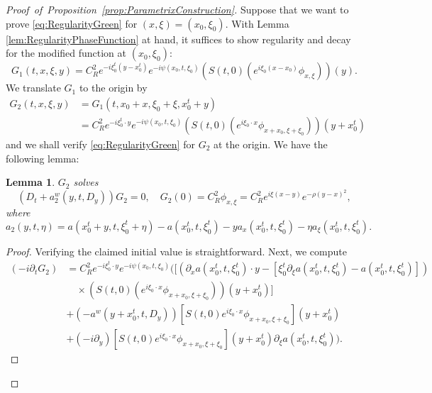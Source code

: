 \documentclass{amsart}
\newtheorem{lemma}[theorem]{Lemma}
\theoremstyle{definition}
\begin{document}
\begin{proof}[Proof~of~Proposition~\ref{prop:ParametrixConstruction}]
Suppose that we want to prove \eqref{eq:RegularityGreen} for $(x,\xi) = (x_0,\xi_0)$. With Lemma \ref{lem:RegularityPhaseFunction} at hand, it suffices to show regularity and decay for the modified function at $(x_0,\xi_0)$:
\begin{equation*}
G_1(t,x,\xi,y) = C_R^2 e^{-i \xi_0^t (y-x_0^t) } e^{-i \psi(x_0,t,\xi_0)} (S(t,0) (e^{i \xi_0 (x-x_0)} \phi_{x,\xi}))(y).
\end{equation*}
We translate $G_1$ to the origin by
\begin{equation*}
\begin{split}
G_2(t,x,\xi,y) &= G_1(t,x_0+x,\xi_0+\xi,x_0^t + y) \\
&= C_R^2 e^{-i \xi_0^t \cdot y} e^{-i \psi(x_0,t,\xi_0)} (S(t,0) (e^{i \xi_0 \cdot x} \phi_{x+x_0,\xi+\xi_0}))(y+x_0^t)
\end{split}
\end{equation*}
and we shall verify \eqref{eq:RegularityGreen} for $G_2$ at the origin. We have the following lemma:
\begin{lemma}
$G_2$ solves
\begin{equation*}
(D_t + a_2^w(y,t,D_y)) G_2 = 0, \quad G_2(0) = C_{R}^2 \phi_{x,\xi} = C_R^2 e^{i \xi (x-y)} e^{- \rho(y-x)^2},
\end{equation*}
where
\begin{equation*}
a_2(y,t,\eta) = a(x_0^t+y,t, \xi_0^t + \eta) - a(x_0^t,t,\xi_0^t) - y a_x(x_0^t,t,\xi_0^t) - \eta a_\xi(x_0^t,t,\xi_0^t).
\end{equation*}    
\end{lemma}
\begin{proof}
    Verifying the claimed initial value is straightforward. Next, we compute
    \begin{equation}
    \label{eq:ExpansionTimeDerivativeModGreen}
        \begin{split}
            (-i \partial_t G_2) &= C_R^2 e^{-i \xi_0^t \cdot y} e^{-i \psi(x_0,t,\xi_0)} \big( \big[ (\partial_x a(x_0^t,t,\xi_0^t) \cdot y - [ \xi_0^t \partial_{\xi} a(x_0^t,t,\xi_0^t) - a(x_0^t,t,\xi_0^t)]) \\
            &\quad \times (S(t,0) (e^{i \xi_0 \cdot x} \phi_{x+x_0,\xi+\xi_0}))(y+x_0^t) \big] \\
            \quad &+ (-a^w (y+x_0^t,t,D_y))[S(t,0) e^{i \xi_0 \cdot x} \phi_{x+x_0,\xi+\xi_0}](y+x_0^t) \\
            \quad &+ (-i \partial_y)[S(t,0) e^{i \xi_0 \cdot x} \phi_{x+x_0,\xi+\xi_0}](y+x_0^t) \partial_{\xi} a(x_0^t,t,\xi_0^t) \big).

\end{split}
\end{equation}
\end{proof}
\end{proof}
\end{document}
